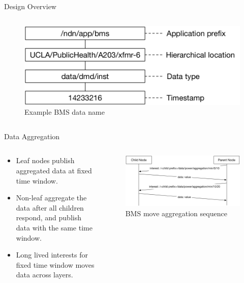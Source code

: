 \documentclass[final,hyperref={pdfpagelabels=false},20pt]{beamer}
\begin{document}
\begin{frame}[t]
\begin{columns}[t]
\begin{column}{.465\textwidth}
\begin{block}{Design Overview}
\begin{columns}[T]
\begin{column}{.50\textwidth}
\begin{figure}
\includegraphics[width=0.9\linewidth]{bms-example-name}
\caption{Example BMS data name}
\label{fig:example-name}
\end{figure}
\end{column}

\end{columns}

\end{block}


\begin{block}{Data Aggregation}

\begin{columns}[T]

\begin{column}{.45\textwidth}
\begin{itemize}
\item{Leaf nodes publish aggregated data at fixed time window.}
\item{Non-leaf aggregate the data after all children respond, and publish data with the same time window.}
\item{Long lived interests for fixed time window moves data across layers.}
\end{itemize}
\end{column}

\begin{column}{.50\textwidth}
\begin{figure}
\includegraphics[width=\linewidth]{bms-move-aggregate-sequence}
\caption{BMS move aggregation sequence}
\label{fig:move-aggregation}
\end{figure}
\end{column}


\end{columns}
\end{block}
\end{column}
\end{columns}
\end{frame}
\end{document}
